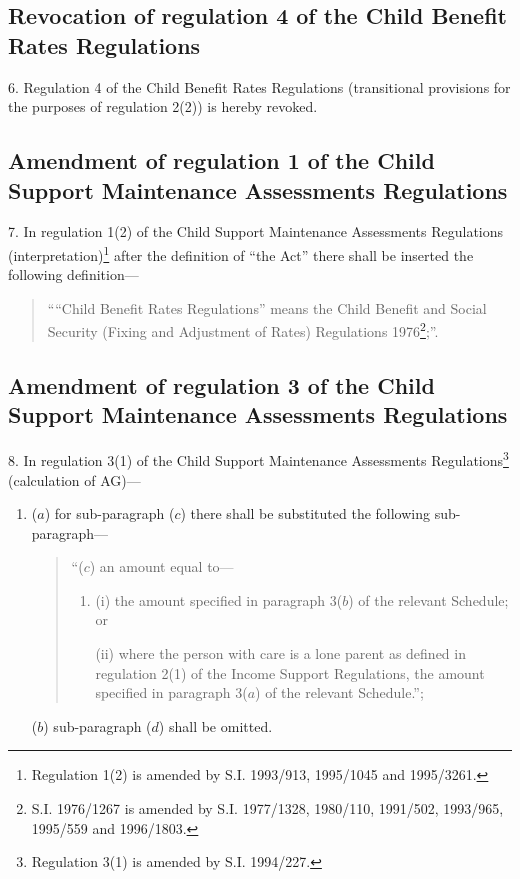 \documentclass[a4paper]{article}
\begin{document}
\subsection[6. Revocation of regulation 4 of the Child Benefit Rates Regulations]{Revocation of regulation 4 of the Child Benefit Rates Regulations}

6.  Regulation 4 of the Child Benefit Rates Regulations (transitional provisions for the purposes of regulation 2(2)) is hereby revoked.

\subsection[7. Amendment of regulation 1 of the Child Support Maintenance Assessments Regulations]{Amendment of regulation 1 of the Child Support Maintenance Assessments Regulations}

7.  In regulation 1(2) of the Child Support Maintenance Assessments Regulations (interpretation)\footnote{\frenchspacing Regulation 1(2) is amended by S.I. 1993/913, 1995/1045 and 1995/3261.} after the definition of “the Act” there shall be inserted the following definition—
\begin{quotation}
““Child Benefit Rates Regulations” means the Child Benefit and Social Security (Fixing and Adjustment of Rates) Regulations 1976\footnote{\frenchspacing S.I. 1976/1267 is amended by S.I. 1977/1328, 1980/110, 1991/502, 1993/965, 1995/559 and 1996/1803.};”.
\end{quotation}

\subsection[8. Amendment of regulation 3 of the Child Support Maintenance Assessments Regulations]{Amendment of regulation 3 of the Child Support Maintenance Assessments Regulations}

8.  In regulation 3(1) of the Child Support Maintenance Assessments Regulations\footnote{\frenchspacing Regulation 3(1) is amended by S.I. 1994/227.} (calculation of AG)—
\begin{enumerate}\item[]
($a$) for sub-paragraph ($c$) there shall be substituted the following sub-paragraph—
\begin{quotation}
“($c$) an amount equal to—
\begin{enumerate}\item[]
(i) the amount specified in paragraph 3($b$) of the relevant Schedule; or

(ii) where the person with care is a lone parent as defined in regulation 2(1) of the Income Support Regulations, the amount specified in paragraph 3($a$) of the relevant Schedule.”;
\end{enumerate}
\end{quotation}

($b$) sub-paragraph ($d$) shall be omitted.
\end{enumerate}
\end{document}
